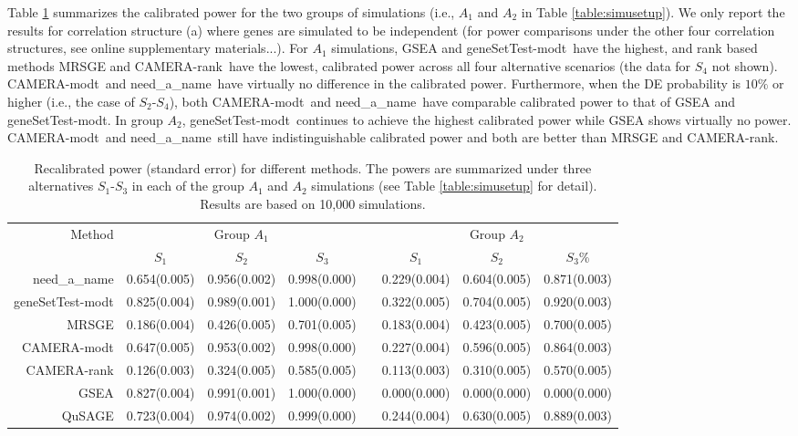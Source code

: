\documentclass[useAMS,usenatbib, galley]{biom}
\newcommand{\OurMethod}{need\_a\_name}
\newcommand{\aaCase}{a}
\newcommand{\CMR}{CAMERA-rank}
\newcommand{\CMT}{CAMERA-modt}
\newcommand{\gent}{geneSetTest-modt}
\begin{document}
	Table \ref{table:power} summarizes the calibrated power for the two groups of simulations (i.e., $A_1$ and $A_2$ in Table \ref{table:simusetup}). We only report the results for correlation structure (\aaCase) where genes are simulated to be independent (for power comparisons under the other four correlation structures, see online supplementary materials...). %
	For $A_1$ simulations, GSEA and \gent~have the highest, and rank based methods MRSGE and \CMR~have the lowest, calibrated power across all four alternative scenarios (the data for $S_4$ not shown). \CMT~and \OurMethod~have virtually no difference in the calibrated power. Furthermore, when the DE probability is $10\%$ or higher (i.e., the case of  $S_2$-$S_4$), both \CMT~and \OurMethod~have comparable calibrated power to that of GSEA and \gent. In group $A_2$, \gent~continues to achieve the highest calibrated power while GSEA shows virtually no power. \CMT~and \OurMethod~still have indistinguishable calibrated power and both are better than MRSGE and \CMR.
	

	
	\begin{table*}
		\centering
		\caption{Recalibrated power (standard error) for different methods. The powers are summarized under three alternatives $S_1$-$S_3$ in each of the group $A_1$ and $A_2$ simulations (see Table \ref{table:simusetup} for detail). Results are based on 10,000 simulations. }\label{table:power}
		\begin{tabular}{rccc c ccc}
			\hline\hline
		Method	& \multicolumn{3}{c}{Group $A_1$} &  & \multicolumn{3}{c}{Group $A_2$} \\
			\cline{2-4}   \cline{6-8}
			 & $S_1$ & $S_2$ & $S_3$	 & & $S_1$ & $S_2$ & $S_3$\% \\
			 \cline{2-4}   \cline{6-8}
			\OurMethod & 0.654(0.005) & 0.956(0.002) & 0.998(0.000) & & 0.229(0.004) & 0.604(0.005) & 0.871(0.003)\\ 
			 \gent & 0.825(0.004) & 0.989(0.001) & 1.000(0.000) & &0.322(0.005) & 0.704(0.005) & 0.920(0.003) \\
			MRSGE & 0.186(0.004) & 0.426(0.005) & 0.701(0.005)& & 0.183(0.004) & 0.423(0.005) & 0.700(0.005) \\ 
			\CMT & 0.647(0.005) & 0.953(0.002) & 0.998(0.000)& & 0.227(0.004) & 0.596(0.005) & 0.864(0.003)  \\ 
			\CMR & 0.126(0.003) & 0.324(0.005) & 0.585(0.005) & &0.113(0.003) & 0.310(0.005) & 0.570(0.005) \\
			GSEA & 0.827(0.004) & 0.991(0.001) & 1.000(0.000) & & 0.000(0.000) & 0.000(0.000) & 0.000(0.000) \\ 
			QuSAGE & 0.723(0.004) & 0.974(0.002) & 0.999(0.000) & &  0.244(0.004) & 0.630(0.005) & 0.889(0.003) \\ 
			\hline\hline
		\end{tabular}
	\end{table*}
	
\end{document}

